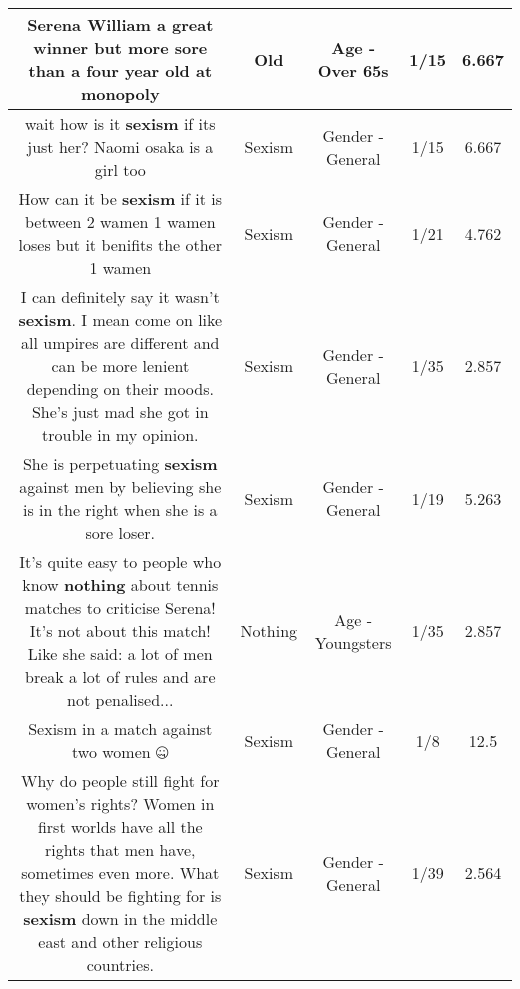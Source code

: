\documentclass[11pt]{article}
\newlength\mylength
\begin{document}
\begin{center}
\begin{longtable}{|C{.65\mylength}|C{.30\mylength}|C{.12\mylength}|C{.12\mylength}|C{.12\mylength}|}
  \small Serena William a great winner but more sore than a four year \textbf{old} at monopoly\normalsize   & Old & Age - Over 65s & 1/15 & 6.667 \\  \hline
  \small wait how is it \textbf{sexism} if its just her? Naomi osaka is a girl too\normalsize   & Sexism & Gender - General & 1/15 & 6.667 \\  \hline
  \small How can it be \textbf{sexism} if it is between 2 wamen 1 wamen loses but it benifits the other 1 wamen\normalsize   & Sexism & Gender - General & 1/21 & 4.762 \\  \hline
  \small I can definitely say it wasn't \textbf{sexism}. I mean come on like all umpires are different and can be more lenient depending on their moods. She's just mad she got in trouble in my opinion.\normalsize   & Sexism & Gender - General & 1/35 & 2.857 \\  \hline
  \small She is perpetuating \textbf{sexism} against men by believing she is in the right when she is a sore loser.\normalsize   & Sexism & Gender - General & 1/19 & 5.263 \\  \hline
  \small It's quite easy to people who know \textbf{nothing} about tennis matches to criticise Serena! It's not about this match! Like she said: a lot of men break a lot of rules and are not penalised...\normalsize   & Nothing & Age - Youngsters & 1/35 & 2.857 \\  \hline
  \small Sexism in a match against two women 🤐\normalsize   & Sexism & Gender - General & 1/8 & 12.5 \\  \hline
  \small Why do people still fight for women's rights? Women in first worlds have all the rights that men have, sometimes even more. What they should be fighting for is \textbf{sexism} down in the middle east and other religious countries.\normalsize   & Sexism & Gender - General & 1/39 & 2.564 \\  \hline

\end{longtable}
\end{center}
\end{document}
